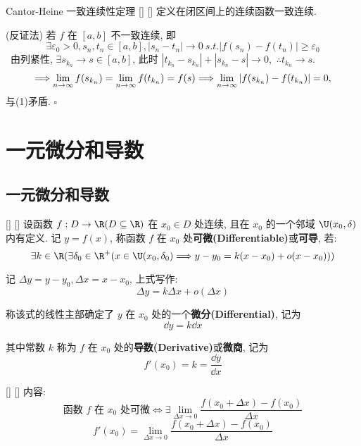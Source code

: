 \documentclass[UTF8]{ctexart}
\begin{document}
			\begin{thm}
			    []
			    {Cantor-Heine 一致连续性定理}
			    []
			    []
				定义在闭区间上的连续函数一致连续. 
			\end{thm}

    		\begin{prf}
				 (反证法) 若 \(f\) 在 \([a,b]\) 不一致连续, 即
				\[\exists\varepsilon_0>0,s_n,t_n\in[a,b],|s_n-t_n|\to 0\ s.t.|f(s_n)-f(t_n)|\geq\varepsilon_0\tag{1}\]\ 
				由列紧性,  \(\exists s_{k_n}\to s\in[a,b]\),
				此时 \(|t_{k_n}-s_{k_n}|+|s_{k_n}-s|\to 0\),\ \(\therefore t_{k_n}\to s\).
				\[\Longrightarrow\lim_{n\to\infty}f(s_{k_n})=\lim_{n\to\infty}f(t_{k_n})=f(s) \\
				\Longrightarrow\lim_{n\to\infty}|f(s_{k_n})-f(t_{k_n})|=0,\]
				与(1)矛盾. \(\square\)
			\end{prf}
				


		
	
	\section{一元微分和导数}
		
		\subsection{一元微分和导数}
		
			\begin{dfn}
			    []
			    {}
			    []
			    []
				设函数 \(f:D\to\R(D\subseteq\R)\) 在 \(x_0\in D\) 处连续, 且在 \(x_0\) 的一个邻域 \(\U(x_0,\delta)\) 内有定义. 记 \(y=f(x)\), 称函数 \(f\) 在 \(x_0\) 处\textbf{可微(Differentiable)}或\textbf{可导}, 若: 
				\[\exists k\in\R(\exists\delta_0\in\R^+(x\in\U(x_0,\delta_0)\Longrightarrow y-y_0=k(x-x_0)+o(x-x_0)))\]
				
				记 \(\Delta y=y-y_0,\Delta x=x-x_0\), 上式写作: 
				\[\Delta y=k\Delta x+o(\Delta x)\]
				
				称该式的线性主部确定了 \(y\) 在 \(x_0\) 处的一个\textbf{微分(Differential)}, 记为
				\[\dd y=k\dd x\]
				
				其中常数 \(k\) 称为 \(f\) 在 \(x_0\) 处的\textbf{导数(Derivative)}或\textbf{微商}, 记为
				\[f'(x_0)=k=\frac{\dd y}{\dd x}\]
			\end{dfn}
			
			\begin{ppt}
			    []
			    {}
			    []
			    []
				内容: 
				\[\mbox{函数 \(f\) 在 \(x_0\) 处可微}\iff\exists\lim_{\Delta x\to 0}\frac{f(x_0+\Delta x)-f(x_0)}{\Delta x}\]
				\[f'(x_0)=\lim_{\Delta x\to 0}\frac{f(x_0+\Delta x)-f(x_0)}{\Delta x}\]
			\end{ppt}
			
\end{document}
